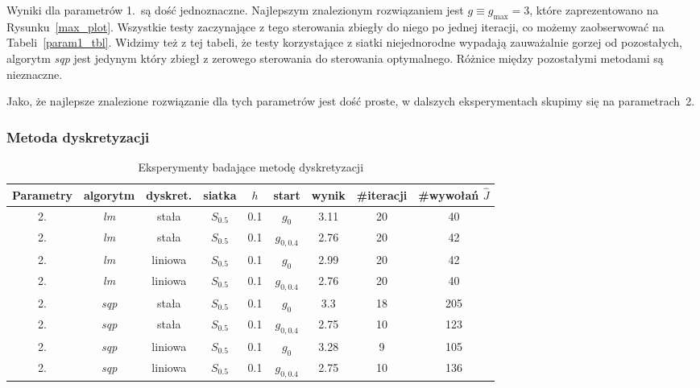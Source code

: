 \documentclass[11pt]{article}
\begin{document}
Wyniki dla parametrów 1.\ są dość jednoznaczne. Najlepszym znalezionym rozwiązaniem jest $g \equiv g_{\max} = 3$, które zaprezentowano na Rysunku~\ref{max_plot}. Wszystkie testy zaczynające z tego sterowania zbiegły do niego po jednej iteracji, co możemy zaobserwować na Tabeli~\ref{param1_tbl}. Widzimy też z tej tabeli, że testy korzystające z siatki niejednorodne wypadają zauważalnie gorzej od pozostałych, algorytm {\it sqp\/} jest jedynym który zbiegł z zerowego sterowania do sterowania optymalnego. Różnice między pozostałymi metodami są nieznaczne.

Jako, że najlepsze znalezione rozwiązanie dla tych parametrów jest dość proste, w dalszych eksperymentach skupimy się na parametrach~2.

\subsubsection{Metoda dyskretyzacji}

\begin{table}[h]
  \begin{center}
    \begin{tabular}{|c|c|c|c|c|c|c|c|c|}
      \hline
      Parametry & algorytm & dyskret. & siatka & $h$ & start & wynik & \#iteracji & \#wywołań $\hat{J}$ \\
      \hline
      2. & {\it lm\/} & stała & $S_{0.5}$ & 0.1 & $g_0$ & 3.11 & 20 & 40 \\
      \hline
      2. & {\it lm\/} & stała & $S_{0.5}$ & 0.1 & $g_{0,0.4}$ & 2.76 & 20 & 42 \\
      \hline
      2. & {\it lm\/} & liniowa & $S_{0.5}$ & 0.1 & $g_0$ & 2.99 & 20 & 42 \\
      \hline
      2. & {\it lm\/} & liniowa & $S_{0.5}$ & 0.1 & $g_{0,0.4}$ & 2.76 & 20 & 40 \\
      \hline
      2. & {\it sqp\/} & stała & $S_{0.5}$ & 0.1 & $g_0$ & 3.3 & 18 & 205 \\
      \hline
      2. & {\it sqp\/} & stała & $S_{0.5}$ & 0.1 & $g_{0,0.4}$ & 2.75 & 10 & 123 \\
      \hline
      2. & {\it sqp\/} & liniowa & $S_{0.5}$ & 0.1 & $g_0$ & 3.28 & 9 & 105 \\
      \hline
      2. & {\it sqp\/} & liniowa & $S_{0.5}$ & 0.1 & $g_{0,0.4}$ & 2.75 & 10 & 136 \\
      \hline
    \end{tabular}
    \caption{Eksperymenty badające metodę dyskretyzacji}\label{discr_tbl}
  \end{center}
\end{table}
\end{document}
